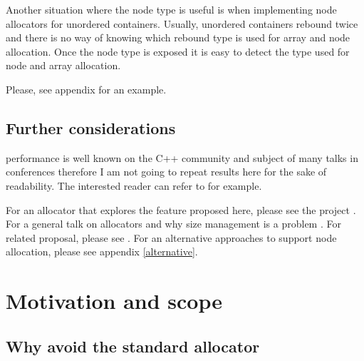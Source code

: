 \documentclass[11pt]{article}
\begin{document}
Another situation where the node type is useful is when implementing
node allocators for unordered containers. Usually, unordered
containers rebound twice and there is no way of knowing which rebound
type is used for array and node allocation. Once the node type is
exposed it is easy to detect the type used for node and array
allocation.

Please, see appendix \cite{unordered} for an example.

%


\subsection{Further considerations}
performance is well known on the C++ community and subject of many
talks in conferences therefore I am not going to repeat results here
for the sake of readability. The interested reader can refer to
\cite{chandler, meyers} for example.

For an allocator that explores the feature proposed here, please see
the project \cite{rtcpp}. For a general
talk on allocators and why size management is a problem
\cite{alexandrescu}. For related proposal, please see \cite{prop1}.
For an alternative approaches to support node allocation, please see
appendix \ref{alternative}.

\section{Motivation and scope}

\subsection{Why avoid the standard allocator}
\end{document}
